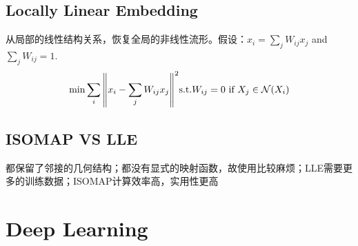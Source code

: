\documentclass[a4paper,landscape]{article}
\begin{document}
\begin{tiny}
\begin{multicols}{4}
		\subsection{Locally Linear Embedding}
		从局部的线性结构关系，恢复全局的非线性流形。假设：$\hat{x}_i=\sum_jW_{ij}x_j$ and $\sum_j W_{ij}=1$.
		\[
			\min \sum_i\norm{x_i-\sum_jW_{ij}x_j}^2
			\text{s.t.} W_{ij}=0 \text{ if }X_j\in\mathcal{N}(X_i)
		\]

		\subsection{ISOMAP VS LLE}
		都保留了邻接的几何结构；都没有显式的映射函数，故使用比较麻烦；LLE需要更多的训练数据；ISOMAP计算效率高，实用性更高
		
		

		\section{Deep Learning}
	\end{multicols}
\end{tiny}
\end{document}
